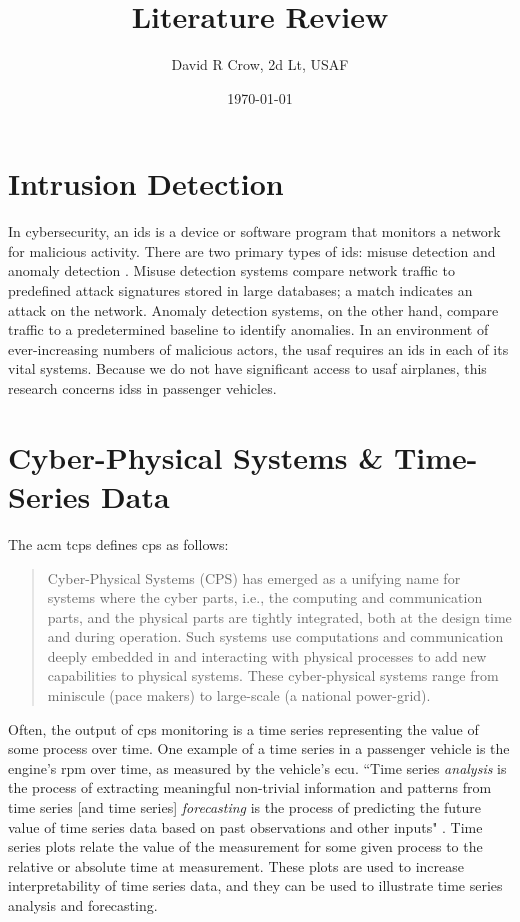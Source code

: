 \documentclass[12pt]{article}
\title{Literature Review}
\author{David R Crow, 2d Lt, USAF}
\date{\today}
\begin{document}
\doublespacing
\maketitle

\section*{Intrusion Detection}

In cybersecurity, an \ac{ids} is a device or software program that monitors a network for malicious activity. There are two primary types of \ac{ids}: misuse detection and anomaly detection \cite{Shirani2015}. Misuse detection systems compare network traffic to predefined attack signatures stored in large databases; a match indicates an attack on the network. Anomaly detection systems, on the other hand, compare traffic to a predetermined baseline to identify anomalies. In an environment of ever-increasing numbers of malicious actors, the \ac{usaf} requires an \ac{ids} in each of its vital systems. Because we do not have significant access to \ac{usaf} airplanes, this research concerns \aclp{ids} in passenger vehicles.

\section*{Cyber-Physical Systems \& Time-Series Data}

The \ac{acm} \ac{tcps} defines \ac{cps} as follows:

\begin{quote}
    Cyber-Physical Systems (CPS) has emerged as a unifying name for systems where the cyber parts, i.e., the computing and communication parts, and the physical parts are tightly integrated, both at the design time and during operation. Such systems use computations and communication deeply embedded in and interacting with physical processes to add new capabilities to physical systems. These cyber-physical systems range from miniscule (pace makers) to large-scale (a national power-grid). \cite{ACMTPS2018}
\end{quote}

Often, the output of \ac{cps} monitoring is a time series representing the value of some process over time. One example of a time series in a passenger vehicle is the engine's \ac{rpm} over time, as measured by the vehicle's \ac{ecu}. ``Time series \textit{analysis} is the process of extracting meaningful non-trivial information and patterns from time series [and time series] \textit{forecasting} is the process of predicting the future value of time series data based on past observations and other inputs" \cite{Kotu2019}. Time series plots relate the value of the measurement for some given process to the relative or absolute time at measurement. These plots are used to increase interpretability of time series data, and they can be used to illustrate time series analysis and forecasting.
\end{document}
